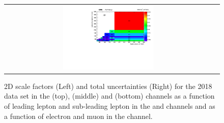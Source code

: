 \begin{figure}[!htb]
\begin{center}
\begin{tabular}{cc}
      \includegraphics[width=0.45\textwidth]{fig_2018_TrigSF/h2D_lepABpt_mumu_BinErrors.pdf}\\
    \end{tabular}
    \caption{2D scale factors (Left) and total uncertainties (Right) for the 2018 data set in the \emu (top), \ee (middle) and \mumu (bottom) channels as a function of leading lepton \pT and sub-leading lepton \pT in the \ee and \mumu channels and as a function of electron \pT and muon \pT in the \emu channel.}
    \label{TrigSF_2018_4}
  \end{center}
\end{figure}

